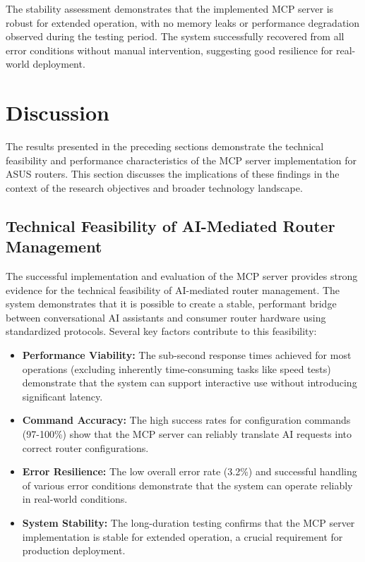 The stability assessment demonstrates that the implemented MCP server is robust for extended operation, with no memory leaks or performance degradation observed during the testing period. The system successfully recovered from all error conditions without manual intervention, suggesting good resilience for real-world deployment.

\section{Discussion}
The results presented in the preceding sections demonstrate the technical feasibility and performance characteristics of the MCP server implementation for ASUS routers. This section discusses the implications of these findings in the context of the research objectives and broader technology landscape.

\subsection{Technical Feasibility of AI-Mediated Router Management}
The successful implementation and evaluation of the MCP server provides strong evidence for the technical feasibility of AI-mediated router management. The system demonstrates that it is possible to create a stable, performant bridge between conversational AI assistants and consumer router hardware using standardized protocols. Several key factors contribute to this feasibility:

\begin{itemize}
\item \textbf{Performance Viability:} The sub-second response times achieved for most operations (excluding inherently time-consuming tasks like speed tests) demonstrate that the system can support interactive use without introducing significant latency.
\item \textbf{Command Accuracy:} The high success rates for configuration commands (97-100\%) show that the MCP server can reliably translate AI requests into correct router configurations.
\item \textbf{Error Resilience:} The low overall error rate (3.2\%) and successful handling of various error conditions demonstrate that the system can operate reliably in real-world conditions.
\item \textbf{System Stability:} The long-duration testing confirms that the MCP server implementation is stable for extended operation, a crucial requirement for production deployment.
\end{itemize}


